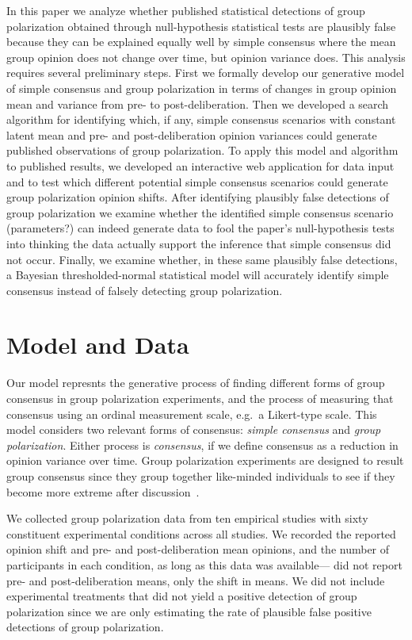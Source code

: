 \documentclass[11pt, letterpaper]{article}
\begin{document}
In this paper we analyze whether published statistical detections of group 
polarization obtained through null-hypothesis statistical tests
are plausibly false because they can be explained equally well by simple consensus
where the mean group opinion does not change over time, but opinion variance does.
This analysis requires several preliminary steps. 
First we formally develop our generative model of simple consensus and group 
polarization in terms of changes in group opinion mean and variance from 
pre- to post-deliberation. Then we developed a search algorithm for identifying 
which, if any, simple consensus scenarios with 
constant latent mean and pre- and post-deliberation opinion variances 
could generate published observations of group polarization. To apply this model
and algorithm to published results, we developed an interactive web application
for data input and to test which different potential simple consensus scenarios 
could generate group polarization opinion shifts. After identifying plausibly false
detections of group polarization we examine whether the identified simple
consensus scenario (parameters?) can indeed generate data to fool the 
paper's null-hypothesis tests into thinking the data actually support the inference
that simple consensus did not occur. Finally, we examine whether, in these same
plausibly false detections, a Bayesian thresholded-normal statistical model
will accurately identify simple consensus instead of falsely detecting group
polarization.

\section{Model and Data}

Our model represnts the generative process of finding different forms of group consensus
in group polarization experiments, and the process of measuring that consensus using
an ordinal measurement scale, e.g.\ a Likert-type scale. This model considers two
relevant forms of consensus: \emph{simple consensus} and \emph{group polarization}.
Either process is \emph{consensus}, if we define consensus as a reduction
in opinion variance over time.  
Group polarization experiments are designed to result group consensus
since they group together like-minded individuals to see if they become more
extreme after discussion~\cite{Turner2018}.

We collected group polarization data from ten empirical studies with sixty constituent
experimental conditions across all studies. We recorded the reported opinion shift and pre- and
post-deliberation mean opinions, and the number of participants
in each condition, as long as this data was available--- 
did not report pre- and post-deliberation
means, only the shift in means. We did not include experimental treatments that did not 
yield a positive detection of group polarization since we are only estimating
the rate of plausible false positive detections of group polarization. 
\end{document}
